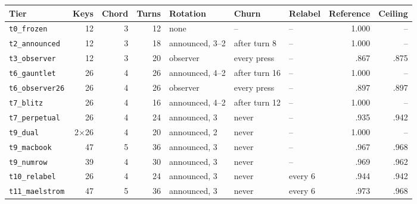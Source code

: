 \begin{tabular}{@{}l r r r l l l r r@{}}
\toprule
Tier & Keys & Chord & Turns & Rotation & Churn & Relabel & Reference & Ceiling \\
\midrule
\texttt{t0\_frozen} & 12 & 3 & 12 & none & -- & -- & 1.000 & -- \\
\texttt{t2\_announced} & 12 & 3 & 18 & announced, 3--2 & after turn 8 & -- & 1.000 & -- \\
\texttt{t3\_observer} & 12 & 3 & 20 & observer & every press & -- & .867 & .875 \\
\texttt{t6\_gauntlet} & 26 & 4 & 26 & announced, 4--2 & after turn 16 & -- & 1.000 & -- \\
\texttt{t6\_observer26} & 26 & 4 & 26 & observer & every press & -- & .897 & .897 \\
\texttt{t7\_blitz} & 26 & 4 & 16 & announced, 4--2 & after turn 12 & -- & 1.000 & -- \\
\texttt{t7\_perpetual} & 26 & 4 & 24 & announced, 3 & never & -- & .935 & .942 \\
\texttt{t9\_dual} & 2$\times$26 & 4 & 20 & announced, 2 & never & -- & 1.000 & -- \\
\texttt{t9\_macbook} & 47 & 5 & 36 & announced, 3 & never & -- & .967 & .968 \\
\texttt{t9\_numrow} & 39 & 4 & 30 & announced, 3 & never & -- & .969 & .962 \\
\texttt{t10\_relabel} & 26 & 4 & 24 & announced, 3 & never & every 6 & .944 & .942 \\
\texttt{t11\_maelstrom} & 47 & 5 & 36 & announced, 3 & never & every 6 & .973 & .968 \\
\bottomrule
\end{tabular}
